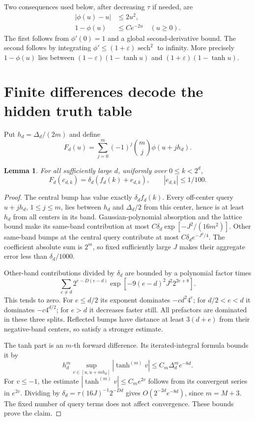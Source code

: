 \documentclass[11pt]{article}
\newtheorem{lemma}[theorem]{Lemma}
\theoremstyle{remark}\newtheorem{remark}[theorem]{Remark}
\begin{document}
Two consequences used below, after decreasing $\tau$ if needed, are
\begin{align}
 |\phi(u)-u|&\le2u^2,\label{eq:taylor}\\
 1-\phi(u)&\le Ce^{-2u}\quad(u\ge0).\label{eq:saturation}
\end{align}
The first follows from $\phi'(0)=1$ and a global second-derivative
bound. The second follows by integrating
$\phi'\le(1+\varepsilon)\operatorname{sech}^2$ to infinity.
More precisely $1-\phi(u)$ lies between
$(1-\varepsilon)(1-\tanh u)$ and
$(1+\varepsilon)(1-\tanh u)$.

\section{Finite differences decode the hidden truth table}
Put $h_d=\Delta_d/(2m)$ and define
\begin{equation}\label{eq:decoder}
 F_d(u)=\sum_{j=0}^m(-1)^j\binom mj\phi(u+jh_d).
\end{equation}
\begin{lemma}\label{lem:decode}
For all sufficiently large $d$, uniformly over $0\le k<2^d$,
\[
 F_d(c_{d,k})=\delta_d(f_d(k)+e_{d,k}),\qquad |e_{d,k}|\le1/100.
\]
\end{lemma}
\begin{proof}
The central bump has value exactly $\delta_df_d(k)$.
Every off-center query $u+jh_d$, $1\le j\le m$, lies between
$h_d$ and $\Delta_d/2$ from this center, hence is at least
$h_d$ from all centers in its band.
Gaussian-polynomial absorption and the lattice bound make its
same-band contribution at most
$C\delta_d\exp[-J^2/(16m^2)]$.
Other same-band bumps at the central query contribute at most
$C\delta_de^{-J^2/4}$.
The coefficient absolute sum is $2^m$, so fixed sufficiently
large $J$ makes their aggregate error less than $\delta_d/1000$.

Other-band contributions divided by $\delta_d$ are bounded by
a polynomial factor times
\[
 \sum_{e\ne d}2^{e-D(e-d)}
           \exp[-9(e-d)^2J^2 2^{2e+8}].
\]
This tends to zero. For $e\le d/2$ its exponent dominates
$-c d^2 4^e$; for $d/2<e<d$ it dominates $-c4^{d/2}$;
for $e>d$ it decreases faster still. All prefactors are
dominated in these three splits.
Reflected bumps have distance at least $3(d+e)$ from their
negative-band centers, so satisfy a stronger estimate.

The tanh part is an $m$-th forward difference.
Its iterated-integral formula bounds it by
\[
 h_d^m\sup_{v\in[u,u+mh_d]}|\tanh^{(m)}v|
       \le C_m\Delta_d^m e^{-8d}.
\]
For $v\le-1$, the estimate
$|\tanh^{(m)}v|\le C_me^{2v}$ follows from its convergent
series in $e^{2v}$.
Dividing by $\delta_d=\tau(16J)^{-1}2^{-Dd}$ gives
$O(2^{-2d}e^{-8d})$, since $m=M+3$.
The fixed number of query terms does not affect convergence.
These bounds prove the claim.
\end{proof}
\end{document}
